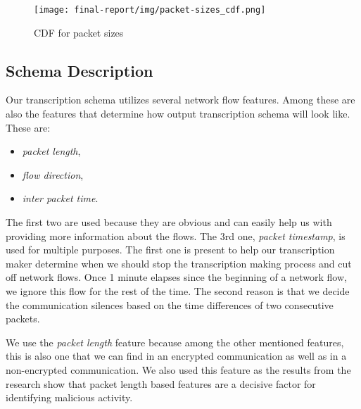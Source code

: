 \documentclass{article}
\begin{document}
\begin{figure}[h!]
    \centering
    \texttt{[image: final-report/img/packet-sizes\_cdf.png]}
    \caption{CDF for packet sizes}
    \label{fig-cdf-packet-sizes}
\end{figure}



\subsection{Schema Description}\label{sec-schema}
Our transcription schema utilizes several network flow features. Among these are also the features that determine how output transcription schema will look like. These are:

\begin{itemize}
    \item \textit{packet length},
    \item \textit{flow direction},
    \item \textit{inter packet time}.
\end{itemize}

The first two are used because they are obvious and can easily help us with providing more information about the flows. The 3rd one, \textit{packet timestamp}, is used for multiple purposes. The first one is present to help our transcription maker determine when we should stop the transcription making process and cut off network flows. Once 1 minute elapses since the beginning of a network flow, we ignore this flow for the rest of the time. The second reason is that we decide the communication silences based on the time differences of two consecutive packets.

We use the \textit{packet length} feature because among the other mentioned features, this is also one that we can find in an encrypted communication as well as in a non-encrypted communication. We also used this feature as the results from the research \cite{meghdouri2018analysis} show that packet length based features are a decisive factor for identifying malicious activity.

\end{document}
